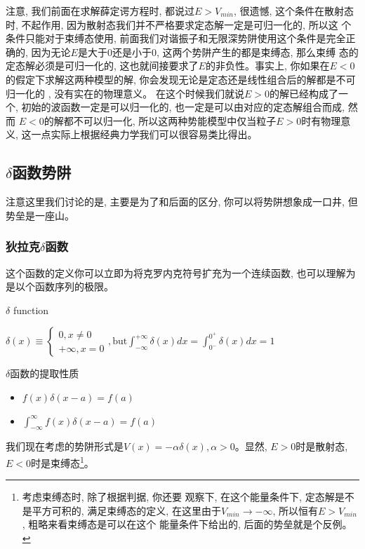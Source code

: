 \documentclass[a4paper,zihao=-4,linespread=1]{ctexrep}
\begin{document}
    注意, 我们前面在求解薛定谔方程时, 都说过$E>V_{min}$, 很遗憾, 这个条件在散射态时, 不起作用, 因为散射态我们并不严格要求定态解一定是可归一化的, 所以这
    个条件只能对于束缚态使用, 前面我们对谐振子和无限深势阱使用这个条件是完全正确的, 因为无论$E$是大于$0$还是小于$0$, 这两个势阱产生的都是束缚态, 那么束缚
    态的定态解必须是可归一化的, 这也就间接要求了$E$的非负性。事实上, 你如果在$E<0$的假定下求解这两种模型的解, 你会发现无论是定态还是线性组合后的解都是不可归一化的
    , 没有实在的物理意义。 在这个时候我们就说$E>0$的解已经构成了一个, 初始的波函数一定是可以归一化的, 也一定是可以由对应的定态解组合而成, 然而
    $E<0$的解都不可以归一化, 所以这两种势能模型中仅当粒子$E>0$时有物理意义, 这一点实际上根据经典力学我们可以很容易类比得出。

    \subsection{\texorpdfstring{$\delta$}d函数势阱}
    注意这里我们讨论的是, 主要是为了和后面的区分, 你可以将势阱想象成一口井, 但势垒是一座山。
    \subsubsection*{狄拉克$\delta$函数}
    这个函数的定义你可以立即为将克罗内克符号扩充为一个连续函数, 也可以理解为是以个函数序列的极限。
    \begin{define}{$\delta$ function}
        \begin{center}
            \begin{math}
                \displaystyle
                \delta(x)\equiv
                \begin{cases}
                    0, x\neq 0\\
                    +\infty,x=0
                \end{cases},\text{but}\int_{-\infty}^{+\infty}\delta(x) dx=\int_{0^-}^{0^+}\delta(x) dx=1
            \end{math}
        \end{center}
    \end{define}
    \begin{proposition}{$\delta$函数的提取性质}
        \begin{itemize}
            \item $f(x)\delta(x-a)=f(a)$
            \item $\int_{-\infty}^{\infty}f(x)\delta(x-a)=f(a)$
        \end{itemize}
    \end{proposition}
    我们现在考虑的势阱形式是$V(x)=-\alpha\delta(x),\alpha>0$。显然, $E>0$时是散射态, $E<0$时是束缚态\footnote{考虑束缚态时, 除了根据判据, 你还要
    观察下, 在这个能量条件下, 定态解是不是平方可积的, 满足束缚态的定义, 在这里由于$V_{min}\to -\infty$, 所以恒有$E>V_{min}$, 粗略来看束缚态是可以在这个
    能量条件下给出的, 后面的势垒就是个反例。}。
\end{document}
